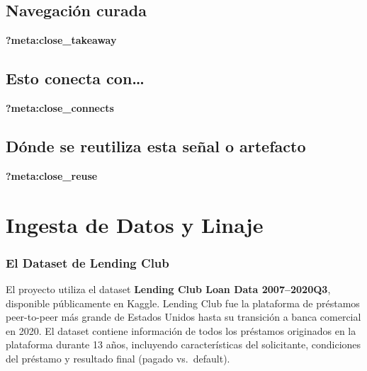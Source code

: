 \documentclass[
  spanish,
  11pt,
  letterpaper,
]{scrbook}
\theoremstyle{plain}
\theoremstyle{remark}
\begin{document}
\section{Navegación curada}\label{navegaciuxf3n-curada-1}

\begin{tcolorbox}[enhanced jigsaw, arc=.35mm, bottomrule=.15mm, bottomtitle=1mm, breakable, colback=white, colbacktitle=quarto-callout-tip-color!10!white, colframe=quarto-callout-tip-color-frame, coltitle=black, left=2mm, leftrule=.75mm, opacityback=0, opacitybacktitle=0.6, rightrule=.15mm, title=\textcolor{quarto-callout-tip-color}{\faLightbulb}\hspace{0.5em}{Qué debes quedarte}, titlerule=0mm, toprule=.15mm, toptitle=1mm]

\textbf{?meta:close\_takeaway}

\section{Esto conecta con\ldots{}}\label{esto-conecta-con-2}

\textbf{?meta:close\_connects}

\section{Dónde se reutiliza esta señal o
artefacto}\label{duxf3nde-se-reutiliza-esta-seuxf1al-o-artefacto-2}

\textbf{?meta:close\_reuse}

\end{tcolorbox}

\chapter{Ingesta de Datos y Linaje}\label{sec-data-ingestion}

\subsection{El Dataset de Lending
Club}\label{el-dataset-de-lending-club}

El proyecto utiliza el dataset \textbf{Lending Club Loan Data
2007--2020Q3}, disponible públicamente en Kaggle. Lending Club fue la
plataforma de préstamos peer-to-peer más grande de Estados Unidos hasta
su transición a banca comercial en 2020. El dataset contiene información
de todos los préstamos originados en la plataforma durante 13 años,
incluyendo características del solicitante, condiciones del préstamo y
resultado final (pagado vs.~default).
\end{document}
